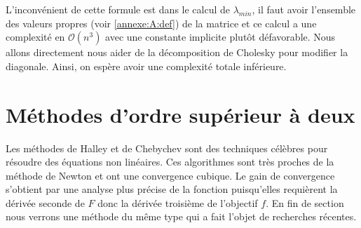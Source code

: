 L'inconv\'enient de cette formule est dans le calcul de $\lambda_{min}$, il faut avoir l'ensemble des valeurs propres (voir \ref{annexe:A:def})  de
la matrice et ce calcul a une complexit\'e en $\mathcal{O}(n^3)$ avec une constante implicite plutôt d\'efavorable. 
Nous allons directement nous aider de la d\'ecomposition de Cholesky pour modifier la diagonale. Ainsi, on esp\`ere avoir
une complexit\'e totale inf\'erieure.










\section{M\'ethodes d'ordre sup\'erieur \`a deux}
Les m\'ethodes de Halley et de Chebychev sont des techniques c\'el\`ebres pour r\'esoudre des \'equations non lin\'eaires. Ces algorithmes
sont tr\`es proches de la m\'ethode de Newton et ont une convergence cubique. Le gain de convergence s'obtient par une analyse
plus pr\'ecise de la fonction puisqu'elles requi\`erent la d\'eriv\'ee seconde de $F$ donc la d\'eriv\'ee troisi\`eme de l'objectif $f$.
En fin de section nous verrons une m\'ethode du même type qui a fait l'objet de recherches r\'ecentes.

